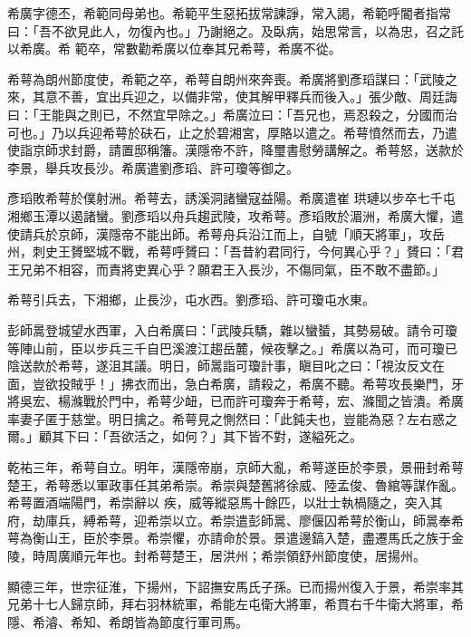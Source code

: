 \begin{pinyinscope}
 希廣字德丕，希範同母弟也。希範平生惡拓拔常諫諍，常入謁，希範呼閽者指常曰：「吾不欲見此人，勿復內也。」乃謝絕之。及臥病，始思常言，以為忠，召之託以希廣。希
 範卒，常數勸希廣以位奉其兄希萼，希廣不從。



 希萼為朗州節度使，希範之卒，希萼自朗州來奔喪。希廣將劉彥瑫謀曰：「武陵之來，其意不善，宜出兵迎之，以備非常，使其解甲釋兵而後入。」張少敵、周廷誨曰：「王能與之則已，不然宜早除之。」希廣泣曰：「吾兄也，焉忍殺之，分國而治可也。」乃以兵迎希萼於砆石，止之於碧湘宮，厚賂以遣之。希萼憤然而去，乃遣使詣京師求封爵，請置邸稱籓。漢隱帝不許，降璽書慰勞講解之。希萼怒，送款於李景，舉兵攻長沙。希廣遣劉彥瑫、許可瓊等御之。



 彥瑫敗希萼於僕射洲。希萼去，誘溪洞諸蠻寇益陽。希廣遣崔
 珙璉以步卒七千屯湘鄉玉潭以遏諸蠻。劉彥瑫以舟兵趨武陵，攻希萼。彥瑫敗於湄洲，希廣大懼，遣使請兵於京師，漢隱帝不能出師。希萼舟兵沿江而上，自號「順天將軍」，攻岳州，刺史王贇堅城不戰，希萼呼贇曰：「吾昔約君同行，今何異心乎？」贇曰：「君王兄弟不相容，而責將吏異心乎？願君王入長沙，不傷同氣，臣不敢不盡節。」



 希萼引兵去，下湘鄉，止長沙，屯水西。劉彥瑫、許可瓊屯水東。



 彭師暠登城望水西軍，入白希廣曰：「武陵兵驕，雜以蠻蜑，其勢易破。請令可瓊等陣山前，臣以步兵三千自巴溪渡江趨岳麓，候夜擊之。」希廣以為可，而可瓊已
 陰送款於希萼，遂沮其議。明日，師暠詣可瓊計事，瞋目叱之曰：「視汝反文在面，豈欲投賊乎！」拂衣而出，急白希廣，請殺之，希廣不聽。希萼攻長樂門，牙將吳宏、楊滌戰於門中，希萼少衄，已而許可瓊奔于希萼，宏、滌聞之皆潰。希廣率妻子匿于慈堂。明日擒之。希萼見之惻然曰：「此鈍夫也，豈能為惡？左右惑之爾。」顧其下曰：「吾欲活之，如何？」其下皆不對，遂縊死之。



 乾祐三年，希萼自立。明年，漢隱帝崩，京師大亂，希萼遂臣於李景，景冊封希萼楚王，希萼悉以軍政事任其弟希崇。希崇與楚舊將徐威、陸孟俊、魯綰等謀作亂。希萼置酒端陽門，希崇辭以
 疾，威等縱惡馬十餘匹，以壯士執楇隨之，突入其府，劫庫兵，縛希萼，迎希崇以立。希崇遣彭師暠、廖偃囚希萼於衡山，師暠奉希萼為衡山王，臣於李景。希崇懼，亦請命於景。景遣邊鎬入楚，盡遷馬氏之族于金陵，時周廣順元年也。封希萼楚王，居洪州；希崇領舒州節度使，居揚州。



 顯德三年，世宗征淮，下揚州，下詔撫安馬氏子孫。已而揚州復入于景，希崇率其兄弟十七人歸京師，拜右羽林統軍，希能左屯衛大將軍，希貫右千牛衛大將軍，希隱、希濬、希知、希朗皆為節度行軍司馬。




\end{pinyinscope}
